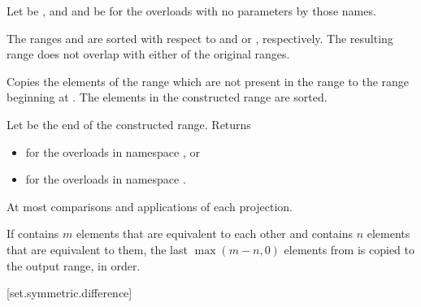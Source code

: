 \begin{itemdescr}
\pnum
Let  be ,
and  and  be 
for the overloads with no parameters by those names.

\pnum
\expects
The ranges  and  are sorted
with respect to  and  or , respectively.
The resulting range does not overlap with either of the original ranges.

\pnum
\effects
Copies the elements of the range 
which are not present in the range 
to the range beginning at .
The elements in the constructed range are sorted.

\pnum
\returns
Let  be the end of the constructed range.
Returns
\begin{itemize}
\item
  for the overloads in namespace , or
\item
  for the overloads in namespace .
\end{itemize}

\pnum
\complexity
At most 
comparisons and applications of each projection.

\pnum
\remarks
If  contains $m$ elements
that are equivalent to each other and
 contains $n$ elements
that are equivalent to them,
the last $\max(m - n, 0)$ elements from 
is copied to the output range, in order.
\end{itemdescr}

[set.symmetric.difference]{}

